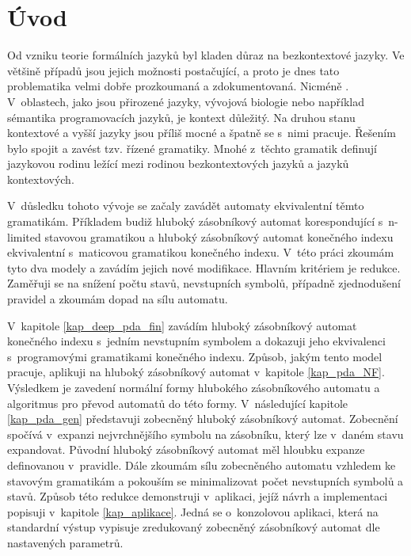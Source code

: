 
\chapter{Úvod}

Od vzniku teorie formálních jazyků byl kladen důraz na bezkontextové jazyky. Ve většině případů jsou jejich možnosti postačující, a proto je dnes tato problematika velmi dobře prozkoumaná a zdokumentovaná. Nicméně  \cite{Dassow:RegulatedRewriting}. V~oblastech, jako jsou přirozené jazyky, vývojová biologie nebo například sémantika programovacích jazyků, je kontext důležitý. Na druhou stanu kontextové a vyšší jazyky jsou příliš mocné a špatně se s~nimi pracuje. Řešením bylo spojit  \cite{Dassow:RegulatedRewriting} a zavést tzv. řízené gramatiky. Mnohé z~těchto gramatik definují jazykovou rodinu ležící mezi rodinou bezkontextových jazyků a jazyků kontextových.

V~důsledku tohoto vývoje se začaly zavádět automaty ekvivalentní těmto gramatikám. Příkladem budiž hluboký zásobníkový automat \cite{Meduna:DeepPDA} korespondující s~n-limited stavovou gramatikou a hluboký zásobníkový automat konečného indexu \cite{Meduna:FinitelyDeepPDA} ekvivalentní s~maticovou gramatikou konečného indexu. V~této práci zkoumám tyto dva modely a zavádím jejich nové modifikace. Hlavním kritériem je redukce. Zaměřuji se na snížení počtu stavů, nevstupních symbolů, případně zjednodušení pravidel a zkoumám dopad na sílu automatu.


V~kapitole \ref{kap_deep_pda_fin} zavádím hluboký zásobníkový automat konečného indexu s~jedním nevstupním symbolem a dokazuji jeho ekvivalenci s~programovými gramatikami konečného indexu. Způsob, jakým tento model pracuje, aplikuji na hluboký zásobníkový automat v~kapitole \ref{kap_pda_NF}. Výsledkem je zavedení normální formy hlubokého zásobníkového automatu a algoritmus pro převod automatů do této formy. V~následující kapitole \ref{kap_pda_gen} představuji zobecněný hluboký zásobníkový automat. Zobecnění spočívá v~expanzi nejvrchnějšího symbolu na zásobníku, který lze v~daném stavu expandovat. Původní hluboký zásobníkový automat měl hloubku expanze definovanou v~pravidle. Dále zkoumám sílu zobecněného automatu vzhledem ke stavovým gramatikám a pokouším se minimalizovat počet nevstupních symbolů a stavů. Způsob této redukce demonstruji v~aplikaci, jejíž návrh a implementaci popisuji v~kapitole \ref{kap_aplikace}. Jedná se o~konzolovou aplikaci, která na standardní výstup vypisuje zredukovaný zobecněný zásobníkový automat dle nastavených parametrů.


